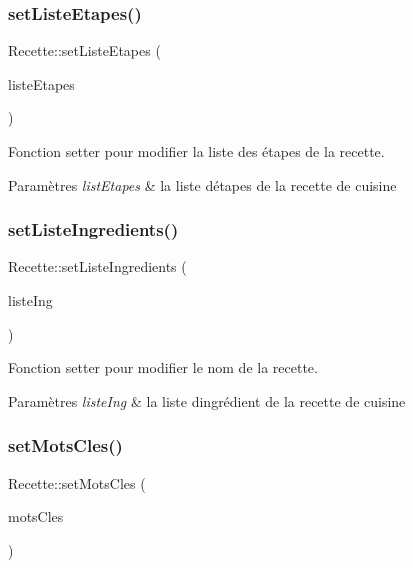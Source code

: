 \subsubsection{\texorpdfstring{set\+Liste\+Etapes()}{setListeEtapes()}}
{\footnotesize\ttfamily Recette\+::set\+Liste\+Etapes (\begin{DoxyParamCaption}\item[{const Q\+String\+List \&}]{liste\+Etapes }\end{DoxyParamCaption})}



Fonction setter pour modifier la liste des étapes de la recette. 


\begin{DoxyParams}{Paramètres}
{\em list\+Etapes} & la liste d\textquotesingle{}étapes de la recette de cuisine \\
\hline
\end{DoxyParams}
\mbox{\label{classRecette_a08b6eff8e2b20a39edf7fc04c2a827f9}} 
\subsubsection{\texorpdfstring{set\+Liste\+Ingredients()}{setListeIngredients()}}
{\footnotesize\ttfamily Recette\+::set\+Liste\+Ingredients (\begin{DoxyParamCaption}\item[{const Q\+String\+List \&}]{liste\+Ing }\end{DoxyParamCaption})}



Fonction setter pour modifier le nom de la recette. 


\begin{DoxyParams}{Paramètres}
{\em liste\+Ing} & la liste d\textquotesingle{}ingrédient de la recette de cuisine \\
\hline
\end{DoxyParams}
\mbox{\label{classRecette_a943923535c745e6bf84cd55b223287d2}} 
\subsubsection{\texorpdfstring{set\+Mots\+Cles()}{setMotsCles()}}
{\footnotesize\ttfamily Recette\+::set\+Mots\+Cles (\begin{DoxyParamCaption}\item[{const Q\+String \&}]{mots\+Cles }\end{DoxyParamCaption})}



